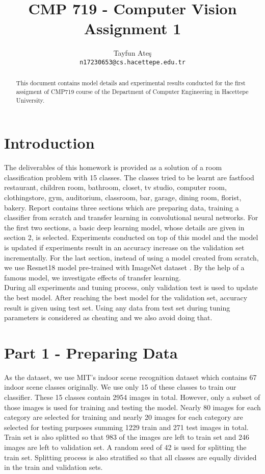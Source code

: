 \documentclass{article}
\title{CMP 719 - Computer Vision Assignment 1}
\author{
  Tayfun Ateş \\
  \texttt{n17230653@cs.hacettepe.edu.tr} \\
}
\begin{document}
\maketitle


\begin{abstract}

This document contains model details and experimental results conducted for the first assigment
of CMP719 course of the Department of Computer Engineering in Hacettepe University.

\end{abstract}

\section{Introduction}

 The deliverables of this homework is provided as a solution of a room classification problem with 15 classes. The classes tried to be learnt are fastfood restaurant, children room, bathroom, closet, tv studio, computer room, clothingstore, gym, auditorium, classroom, bar, garage, dining room, florist, bakery. Report contains three sections which are preparing data, training a classifier from scratch and transfer learning in convolutional neural networks. For the first two sections, a basic deep learning model, whose details are given in section 2, is selected. Experiments conducted on top of this model and the model is updated if experiments result in an accuracy increase on the validation set incrementally. For the last section, instead of using a model created from scratch, we use Resnet18 model \cite{he2016deep} pre-trained with ImageNet dataset  \cite{russakovsky2015imagenet}. By the help of a famous model, we investigate effects of transfer learning. \\
 
 During all experiments and tuning process, only validation test is used to update the best model. After reaching the best model for the validation set, accuracy result is given using test set. Using any data from test set during tuning parameters is considered as cheating and we also avoid doing that.

\section{Part 1 - Preparing Data}

As the dataset, we use MIT's indoor scene recognition dataset \cite{quattoni2009recognizing} which contains 67 indoor scene classes originally. We use only 15 of these classes to train our classifier. These 15 classes contain 2954 images in total. However, only a subset of those images is used for training and testing the model. Nearly 80 images for each category are selected for training and nearly 20 images for each category are selected for testing purposes summing 1229 train and 271 test images in total. Train set is also splitted so that 983 of the images are left to train set and 246 images are left to validation set. A random seed of 42 is used for splitting the train set. Splitting process is also stratified so that all classes are equally divided in the train and validation sets.\\
\end{document}
